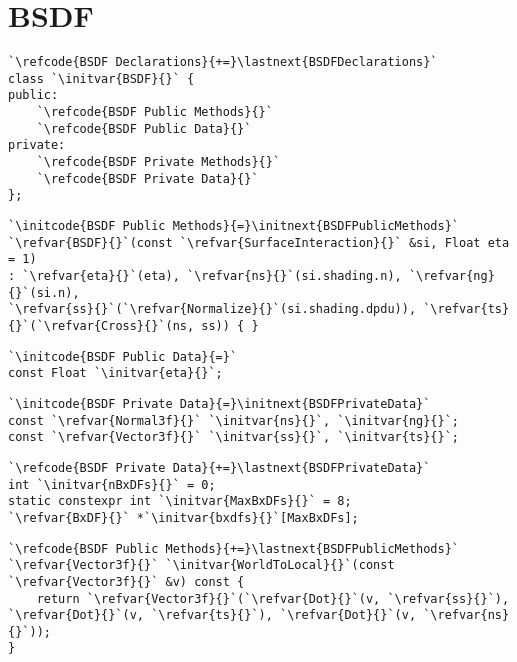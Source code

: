 \section{BSDF}\label{sec:BSDF}

\begin{lstlisting}
`\refcode{BSDF Declarations}{+=}\lastnext{BSDFDeclarations}`
class `\initvar{BSDF}{}` {
public:
    `\refcode{BSDF Public Methods}{}`
    `\refcode{BSDF Public Data}{}`
private:
    `\refcode{BSDF Private Methods}{}`
    `\refcode{BSDF Private Data}{}`
};
\end{lstlisting}

\begin{lstlisting}
`\initcode{BSDF Public Methods}{=}\initnext{BSDFPublicMethods}`
`\refvar{BSDF}{}`(const `\refvar{SurfaceInteraction}{}` &si, Float eta = 1)
: `\refvar{eta}{}`(eta), `\refvar{ns}{}`(si.shading.n), `\refvar{ng}{}`(si.n),
`\refvar{ss}{}`(`\refvar{Normalize}{}`(si.shading.dpdu)), `\refvar{ts}{}`(`\refvar{Cross}{}`(ns, ss)) { }
\end{lstlisting}

\begin{lstlisting}
`\initcode{BSDF Public Data}{=}`
const Float `\initvar{eta}{}`;
\end{lstlisting}

\begin{lstlisting}
`\initcode{BSDF Private Data}{=}\initnext{BSDFPrivateData}`
const `\refvar{Normal3f}{}` `\initvar{ns}{}`, `\initvar{ng}{}`;
const `\refvar{Vector3f}{}` `\initvar{ss}{}`, `\initvar{ts}{}`;
\end{lstlisting}

\begin{lstlisting}
`\refcode{BSDF Private Data}{+=}\lastnext{BSDFPrivateData}`
int `\initvar{nBxDFs}{}` = 0;
static constexpr int `\initvar{MaxBxDFs}{}` = 8;
`\refvar{BxDF}{}` *`\initvar{bxdfs}{}`[MaxBxDFs];
\end{lstlisting}

\begin{lstlisting}
`\refcode{BSDF Public Methods}{+=}\lastnext{BSDFPublicMethods}`
`\refvar{Vector3f}{}` `\initvar{WorldToLocal}{}`(const `\refvar{Vector3f}{}` &v) const {
    return `\refvar{Vector3f}{}`(`\refvar{Dot}{}`(v, `\refvar{ss}{}`), `\refvar{Dot}{}`(v, `\refvar{ts}{}`), `\refvar{Dot}{}`(v, `\refvar{ns}{}`));
}
\end{lstlisting}

